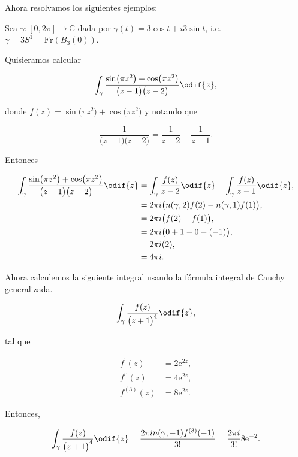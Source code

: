 \documentclass[../main.tex]{subfiles}
\begin{document}
Ahora resolvamos los siguientes ejemplos:
\begin{example}
    Sea \(\gamma \colon [0, 2\pi] \to \mathbb{C}\) dada por \(\gamma(t) =
        3\cos t + i3\sin
    t\), i.e. \(\gamma = 3S^{1} = \mathrm{Fr}(B_{3}(0))\).

    Quisieramos calcular

    \begin{equation*}
        \int_{\gamma}^{}\dfrac{\sin\bigl(\pi z^{2}\bigr) + \cos\bigl(\pi
        z^{2}\bigr)}{\bigl(z
        - 1\bigr)\bigl(z - 2\bigr)}\odif{z},
    \end{equation*}

    donde \(f(z) = \sin\bigl(\pi z^{2}\bigr) + \cos\bigl(\pi
    z^{2}\bigr)\) y notando que

    \begin{equation*}
        \dfrac{1}{\bigl(z - 1\bigr)\bigl(z - 2\bigr)} = \dfrac{1}{z - 2}
        - \dfrac{1}{z - 1}.
    \end{equation*}

    Entonces

    \begin{align*}
        \int_{\gamma}^{}\dfrac{\sin\bigl(\pi z^{2}\bigr) + \cos\bigl(\pi
        z^{2}\bigr)}{\bigl(z
        - 1\bigr)\bigl(z - 2\bigr)}\odif{z} &= \int_{\gamma}^{}\dfrac{f(z)}{z -
        2}\odif{z} - \int_{\gamma}^{}\dfrac{f(z)}{z - 1}\odif{z},\\
        &= 2\pi i \bigl(n(\gamma, 2)f(2) - n(\gamma, 1)f(1)\bigr),\\
        &= 2\pi i \bigl(f(2) - f(1)\bigr),\\
        &= 2\pi i \bigl(0 + 1 - 0 - (-1)\bigr),\\
        &= 2\pi i(2),\\
        &= 4\pi i.
    \end{align*}

    Ahora calculemos la siguiente integral usando la fórmula integral de Cauchy
    generalizada.

    \begin{equation*}
        \int_{\gamma}^{}\dfrac{f(z)}{\bigl(z + 1\bigr)^{4}}\odif{z},
    \end{equation*}

    tal que

    \begin{align*}
        f^{\prime}(z) &= 2\mathrm{e}^{2z},\\
        f^{\prime\prime}(z) &= 4\mathrm{e}^{2z},\\
        f^{(3)}(z) &= 8\mathrm{e}^{2z}.
    \end{align*}

    Entonces,

    \begin{equation*}
        \int_{\gamma}^{}\dfrac{f(z)}{\bigl(z + 1\bigr)^{4}}\odif{z} =
        \dfrac{2\pi in(\gamma,
        -1)f^{(3)}(-1)}{3!} = \dfrac{2\pi i}{3!}8\mathrm{e}^{-2}.
    \end{equation*}
\end{example}
\end{document}
